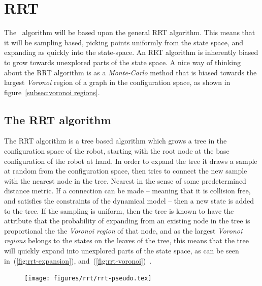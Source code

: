 \section{RRT}

The \rrtfunnel\ algorithm will be based upon the general \ac{RRT}
algorithm\cite[LaValle]{article}. This means that it will be sampling based,
picking points uniformly from the state space, and expanding as quickly into the
state-space. An \ac{RRT} algorithm is inherently biased to grow towards
unexplored parts of the state space. A nice way of thinking about the \ac{RRT}
algorithm is as a \textit{Monte-Carlo} method that is biased towards the largest
\textit{Voronoi} region of a graph in the configuration space, as shown in
figure~\ref{subsec:voronoi regions}.

\subsection{The RRT algorithm}

The \ac{RRT} algorithm is a tree based algorithm which grows a tree in the
configuration space of the robot, starting with the root node at the base
configuration of the robot at hand. In order to expand the tree it draws a
sample at random from the configuration space, then tries to connect the new
sample with the nearest node in the tree. Nearest in the sense of some
predetermined distance metric. If a connection can be made -- meaning that it is
collision free, and satisfies the constraints of the dynamical model -- then a
new state is added to the tree. If the sampling is uniform, then the tree is
known to have the attribute that the probability of expanding from an existing
node in the tree is proportional the the \textit{Voronoi region} of that node,
and as the largest \textit{Voronoi regions} belongs to the states on the leaves
of the tree, this means that the tree will quickly expand into unexplored parts
of the state space, as can be seen in~(\ref{fig:rrt-expansion}),
and~(\ref{fig:rrt-voronoi})~\cite{Lav06}.

\begin{figure}
  \texttt{[image: figures/rrt/rrt-pseudo.tex]}
\end{figure}

